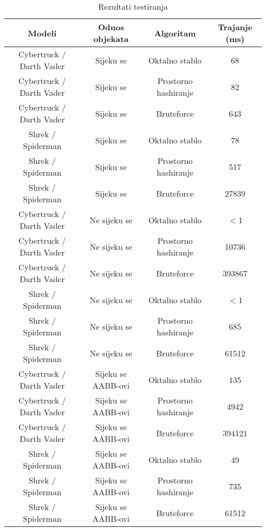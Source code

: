 \begin{table}[h!]
    \begin{center}
      \begin{tabular}{ | c | c | c | c | }
        \hline
        \textbf{Modeli} & \textbf{Odnos objekata} & \textbf{Algoritam} & \textbf{Trajanje (ms)} \\
        \hline
         Cybertruck / Darth Vader & Sijeku se & Oktalno stablo & 68 \\
        \hline
         Cybertruck / Darth Vader & Sijeku se & Prostorno hashiranje & 82 \\
        \hline
         Cybertruck / Darth Vader & Sijeku se & Bruteforce & 643 \\
        \hline
         Shrek / Spiderman & Sijeku se & Oktalno stablo & 78 \\
        \hline
         Shrek / Spiderman & Sijeku se & Prostorno hashiranje & 517 \\
        \hline
         Shrek / Spiderman & Sijeku se & Bruteforce & 27839 \\
        \hline

         Cybertruck / Darth Vader & Ne sijeku se & Oktalno stablo & $<$1 \\
        \hline
         Cybertruck / Darth Vader & Ne sijeku se & Prostorno hashiranje & 10736 \\
        \hline
         Cybertruck / Darth Vader & Ne sijeku se & Bruteforce & 393867 \\
        \hline
         Shrek / Spiderman & Ne sijeku se & Oktalno stablo & $<$1 \\
        \hline
         Shrek / Spiderman & Ne sijeku se & Prostorno hashiranje & 685 \\
        \hline
         Shrek / Spiderman & Ne sijeku se & Bruteforce & 61512 \\
        \hline

         Cybertruck / Darth Vader & Sijeku se AABB-ovi & Oktalno stablo & 135 \\
        \hline
         Cybertruck / Darth Vader & Sijeku se AABB-ovi & Prostorno hashiranje & 4942 \\
        \hline
         Cybertruck / Darth Vader & Sijeku se AABB-ovi & Bruteforce & 394121 \\
        \hline
         Shrek / Spiderman & Sijeku se AABB-ovi & Oktalno stablo & 49 \\
        \hline
         Shrek / Spiderman & Sijeku se AABB-ovi & Prostorno hashiranje & 735 \\
        \hline
         Shrek / Spiderman & Sijeku se AABB-ovi & Bruteforce & 61512 \\
        \hline
      \end{tabular}
    \end{center}
  \caption{Rezultati testiranja}
  \label{table:testresults}
\end{table}


